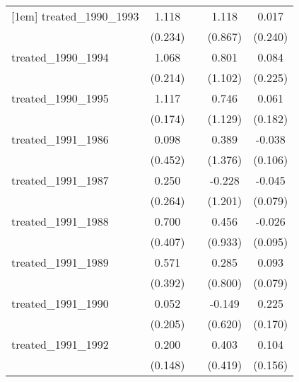 {\begin{tabular}{l*{4}{c}}
[1em]
treated\_1990\_1993&       1.118\sym{***}&                     &       1.118         &       0.017         \\
            &     (0.234)         &                     &     (0.867)         &     (0.240)         \\
[1em]
treated\_1990\_1994&       1.068\sym{***}&                     &       0.801         &       0.084         \\
            &     (0.214)         &                     &     (1.102)         &     (0.225)         \\
[1em]
treated\_1990\_1995&       1.117\sym{***}&                     &       0.746         &       0.061         \\
            &     (0.174)         &                     &     (1.129)         &     (0.182)         \\
[1em]
treated\_1991\_1986&       0.098         &                     &       0.389         &      -0.038         \\
            &     (0.452)         &                     &     (1.376)         &     (0.106)         \\
[1em]
treated\_1991\_1987&       0.250         &                     &      -0.228         &      -0.045         \\
            &     (0.264)         &                     &     (1.201)         &     (0.079)         \\
[1em]
treated\_1991\_1988&       0.700         &                     &       0.456         &      -0.026         \\
            &     (0.407)         &                     &     (0.933)         &     (0.095)         \\
[1em]
treated\_1991\_1989&       0.571         &                     &       0.285         &       0.093         \\
            &     (0.392)         &                     &     (0.800)         &     (0.079)         \\
[1em]
treated\_1991\_1990&       0.052         &                     &      -0.149         &       0.225         \\
            &     (0.205)         &                     &     (0.620)         &     (0.170)         \\
[1em]
treated\_1991\_1992&       0.200         &                     &       0.403         &       0.104         \\
            &     (0.148)         &                     &     (0.419)         &     (0.156)         \\

\end{tabular}}

